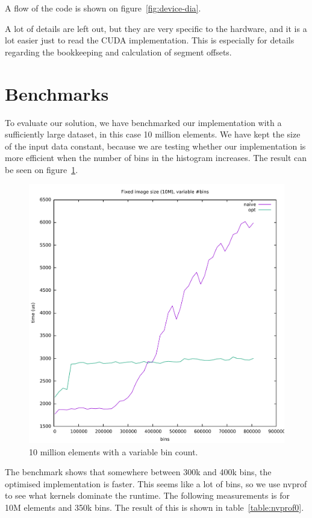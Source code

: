 \documentclass[12pt, a4paper, hidelinks]{article}
\begin{document}
A flow of the code is shown on figure~\ref{fig:device-dia}.

A lot of details are left out, but they are very specific to the hardware,
and it is a lot easier just to read the CUDA implementation.
This is especially for details regarding the bookkeeping and calculation
of segment offsets.

\section{Benchmarks}
To evaluate our solution, we have benchmarked our implementation with
a sufficiently large dataset, in this case 10 million elements.
We have kept the size of the input data constant,
because we are testing whether our implementation is more
efficient when the number of bins in the histogram increases. The result
can be seen on figure~\ref{fig:graph1}.
\begin{figure}[htpb]
    \centering
    \includegraphics[width=0.6\linewidth]{img/graphs/10M-varbins.pdf}
    \caption{10 million elements with a variable bin count.}
    \label{fig:graph1}
\end{figure}
The benchmark shows that somewhere between 300k and 400k bins,
the optimised implementation is faster.
This seems like a lot of bins,
so we use nvprof to see what kernels dominate the runtime.
The following measurements is for 10M elements and 350k bins.
The result of this is shown in table~\ref{table:nvprof0}.
\end{document}
